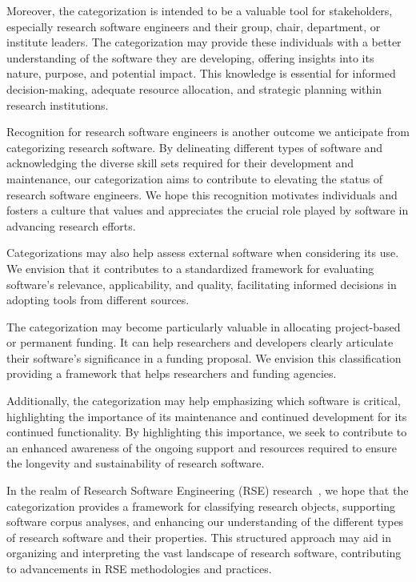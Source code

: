 \documentclass{IEEEcsmag}
\begin{document}
Moreover, the categorization is intended to be a valuable tool for stakeholders, especially research software engineers and their group, chair, department, or institute leaders. The categorization may provide these individuals with a better understanding of the software they are developing, offering insights into its nature, purpose, and potential impact. This knowledge is essential for informed decision-making, adequate resource allocation, and strategic planning within research institutions.

Recognition for research software engineers is another outcome we anticipate from categorizing research software. By delineating different types of software and acknowledging the diverse skill sets required for their development and maintenance, our categorization aims to contribute to elevating the status of research software engineers. We hope this recognition motivates individuals and fosters a culture that values and appreciates the crucial role played by software in advancing research efforts.

Categorizations may also help assess external software when considering its use. We envision that it contributes to a standardized framework for evaluating software's relevance, applicability, and quality, facilitating informed decisions in adopting tools from different sources.

The categorization may become particularly valuable in allocating project-based or permanent funding. It can help researchers and developers clearly articulate their software's significance in a funding proposal. We envision this classification providing a framework that helps researchers and funding agencies.

Additionally, the categorization may help emphasizing which software is critical, highlighting the importance of its maintenance and continued development for its continued functionality. By highlighting this importance, we seek to contribute to an enhanced awareness of the ongoing support and resources required to ensure the longevity and sustainability of research software.

In the realm of Research Software Engineering (RSE) research~\cite{RSER2023}, we hope that the categorization provides a framework for classifying research objects, supporting software corpus analyses, and enhancing our understanding of the different types of research software and their properties. This structured approach may aid in organizing and interpreting the vast landscape of research software, contributing to advancements in RSE methodologies and practices.
\end{document}
